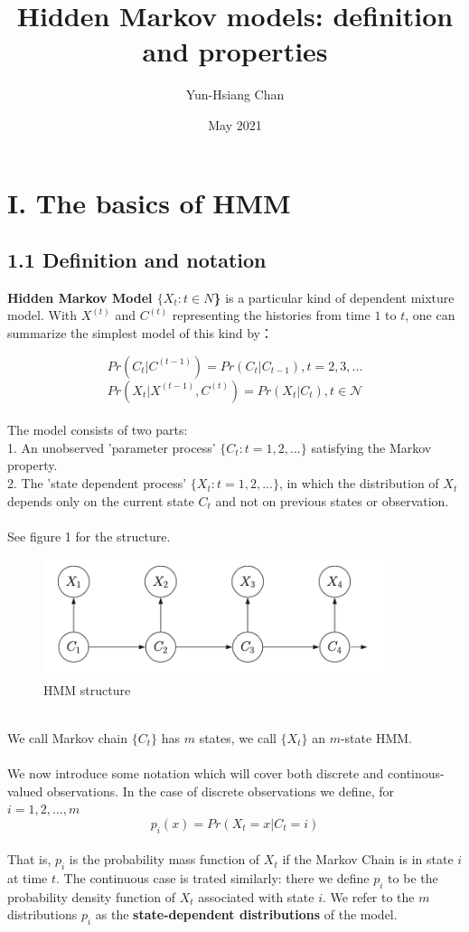 \documentclass{article}
\title{Hidden Markov models: definition and properties}
\author{Yun-Hsiang Chan}
\date{May 2021}
\begin{document}
\maketitle

\section*{I. The basics of HMM}
\subsection*{1.1 Definition and notation}

\textbf{Hidden Markov Model $\{X_t: t \in N$\}} is a particular kind of dependent mixture model. With $X^{(t)}$ and $C^{(t)}$ representing the histories from time $1$ to $t$, one can summarize the simplest model of this kind by： 

$$Pr(C_t | C^{(t-1)}) = Pr(C_t | C_{t-1}), t = 2, 3, ...$$
$$Pr(X_t | X^{(t-1)}, C^{(t)}) = Pr(X_t | C_t), t \in \mathcal{N}$$
\\
The model consists of two parts: \\
1. An unobserved 'parameter process' $\{C_t: t = 1, 2, ...\}$ satisfying the Markov property. \\
2. The 'state dependent process' $\{X_t: t = 1, 2, ...\}$, in which the distribution of $X_t$ depends only on the current state $C_t$ and not on previous states or observation. \\
\\
See figure 1 for the structure. \\
\begin{figure}
    \includegraphics[width = 10cm]{Screen Shot 2021-06-04 at 4.58.33 PM.png}
    \caption{HMM structure}
\end{figure}
\\
We call Markov chain $\{C_t\}$ has $m$ states, we call $\{X_t\}$ an $m$-state HMM. \\
\\
We now introduce some notation which will cover both discrete and continous-valued observations. In the case of discrete observations we define, for $i = 1, 2, ..., m$
$$p_i(x) = Pr(X_t = x | C_t = i)$$
\\
That is, $p_i$ is the probability mass function of $X_t$ if the Markov Chain is in state $i$ at time $t$. The continuous case is trated similarly: there we define $p_i$ to be the probability density function of $X_t$ associated with state $i$. We refer to the $m$ distributions $p_i$ as the \textbf{state-dependent distributions} of the model. 
\end{document}
